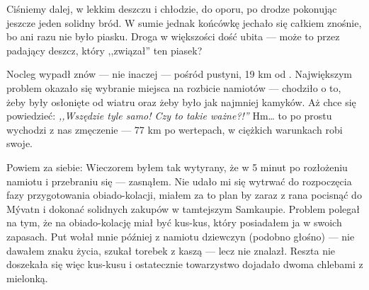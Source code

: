 Ciśniemy dalej, w lekkim deszczu i chłodzie, do oporu, po drodze pokonując jeszcze jeden solidny bród. W sumie jednak końcówkę jechało się całkiem znośnie, bo ani razu nie było piasku. Droga w większości dość ubita --- może to przez padający deszcz, który ,,związał'' ten piasek?


Nocleg wypadł znów --- nie inaczej --- pośród pustyni, 19 km od . Największym problem okazało się wybranie miejsca na rozbicie namiotów --- chodziło o to, żeby były osłonięte od wiatru oraz żeby było jak najmniej kamyków. Aż chce się powiedzieć: \emph{,,Wszędzie tyle samo! Czy to takie ważne?!''} Hm… to po prostu wychodzi z nas zmęczenie --- 77 km po wertepach, w ciężkich warunkach robi swoje.

Powiem za siebie: Wieczorem byłem tak wytyrany, że w 5 minut po rozłożeniu namiotu i przebraniu się --- zasnąłem. Nie udało mi się wytrwać do rozpoczęcia fazy przygotowania obiado-kolacji, miałem za to plan by zaraz z rana pocisnąć do Mývatn i dokonać solidnych zakupów w tamtejszym Samkaupie. Problem polegał na tym, że na obiado-kolację miał być kus-kus, który posiadałem ja w swoich zapasach. Put wołał mnie później z namiotu dziewczyn (podobno głośno) --- nie dawałem znaku życia, szukał torebek z kaszą --- lecz nie znalazł. Reszta nie doszekała się więc kus-kusu i ostatecznie towarzystwo dojadało dwoma chlebami z mielonką.
